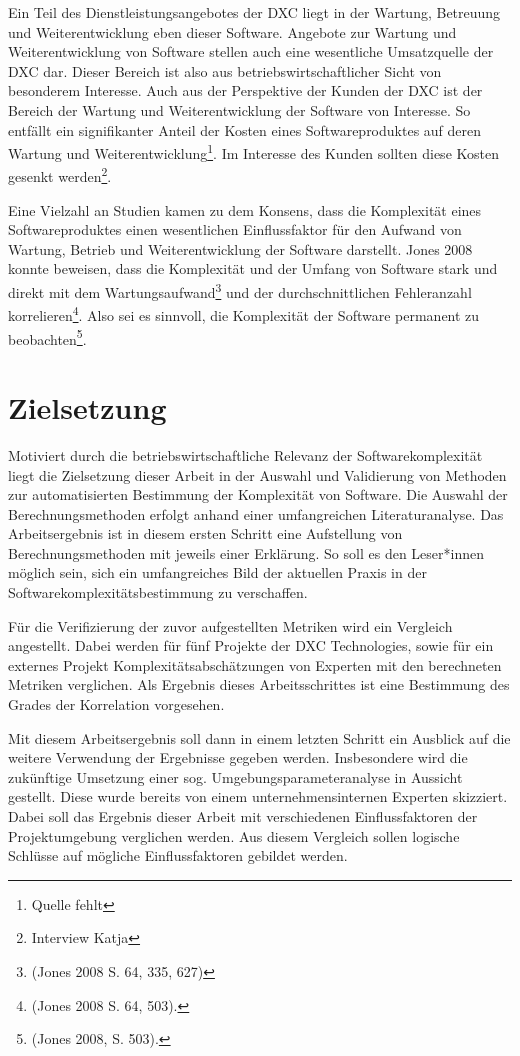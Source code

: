 Ein Teil des Dienstleistungsangebotes der DXC liegt in der Wartung,
Betreuung und Weiterentwicklung eben dieser Software. Angebote zur
Wartung und Weiterentwicklung von Software stellen auch eine wesentliche
Umsatzquelle der DXC dar. Dieser Bereich ist also aus
betriebswirtschaftlicher Sicht von besonderem Interesse. Auch aus der
Perspektive der Kunden der DXC ist der Bereich der Wartung und
Weiterentwicklung der Software von Interesse. So entfällt ein
signifikanter Anteil der Kosten eines Softwareproduktes auf deren
Wartung und Weiterentwicklung\footnote{Quelle fehlt}. Im Interesse des
Kunden sollten diese Kosten gesenkt werden\footnote{Interview Katja}.

Eine Vielzahl an Studien kamen zu dem Konsens, dass die Komplexität
eines Softwareproduktes einen wesentlichen Einflussfaktor für den
Aufwand von Wartung, Betrieb und Weiterentwicklung der Software
darstellt. Jones 2008 konnte beweisen, dass die Komplexität und der
Umfang von Software stark und direkt mit dem Wartungsaufwand\footnote{(Jones
  2008 S. 64, 335, 627)} und der durchschnittlichen Fehleranzahl
korrelieren\footnote{(Jones 2008 S. 64, 503).}. Also sei es sinnvoll,
die Komplexität der Software permanent zu beobachten\footnote{(Jones
  2008, S. 503).}.

\section{Zielsetzung}\label{zielsetzung}

Motiviert durch die betriebswirtschaftliche Relevanz der
Softwarekomplexität liegt die Zielsetzung dieser Arbeit in der Auswahl
und Validierung von Methoden zur automatisierten Bestimmung der
Komplexität von Software. Die Auswahl der Berechnungsmethoden erfolgt
anhand einer umfangreichen Literaturanalyse. Das Arbeitsergebnis ist in
diesem ersten Schritt eine Aufstellung von Berechnungsmethoden mit
jeweils einer Erklärung. So soll es den Leser*innen möglich sein, sich
ein umfangreiches Bild der aktuellen Praxis in der
Softwarekomplexitätsbestimmung zu verschaffen.

Für die Verifizierung der zuvor aufgestellten Metriken wird ein
Vergleich angestellt. Dabei werden für fünf Projekte der DXC
Technologies, sowie für ein externes Projekt Komplexitätsabschätzungen
von Experten mit den berechneten Metriken verglichen. Als Ergebnis
dieses Arbeitsschrittes ist eine Bestimmung des Grades der Korrelation
vorgesehen.

Mit diesem Arbeitsergebnis soll dann in einem letzten Schritt ein
Ausblick auf die weitere Verwendung der Ergebnisse gegeben werden.
Insbesondere wird die zukünftige Umsetzung einer sog.
Umgebungsparameteranalyse in Aussicht gestellt. Diese wurde bereits von
einem unternehmensinternen Experten skizziert. Dabei soll das Ergebnis
dieser Arbeit mit verschiedenen Einflussfaktoren der Projektumgebung
verglichen werden. Aus diesem Vergleich sollen logische Schlüsse auf
mögliche Einflussfaktoren gebildet werden.


